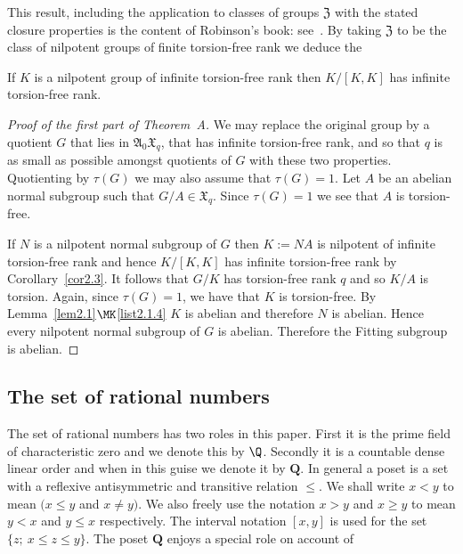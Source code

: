 This result, including the application to classes of groups $\mathfrak Z$ with the stated closure properties is the content of Robinson's book: see~\cite[5.2.5 and 5.2.6]{Rob96}. By taking $\mathfrak Z$ to be the class of nilpotent groups of finite torsion-free rank we deduce the

\begin{coro}\label{cor2.3}
If $K$ is a nilpotent group of infinite torsion-free rank then $K/[K,K]$ has infinite torsion-free rank.
\end{coro}


\begin{proof}[Proof of the first part of Theorem~A]
We may replace the original group by a quotient $G$ that lies in $\mathfrak A_0\mathfrak X_q$, that has infinite torsion-free rank, and so that $q$ is as small as possible amongst quotients of $G$ with these two properties. Quotienting by $\tau(G)$ we may also assume that $\tau(G)=1$. Let $A$ be an abelian normal subgroup such that $G/A\in\mathfrak X_q$. Since $\tau(G)=1$ we see that $A$ is torsion-free.

If $N$ is a nilpotent normal subgroup of $G$ then $K:=NA$ is nilpotent of infinite torsion-free rank and hence $K/[K,K]$ has infinite torsion-free rank by Corollary~\ref{cor2.3}. It follows that $G/K$ has torsion-free rank $q$ and so $K/A$ is torsion. Again, since $\tau(G)=1$, we have that $K$ is torsion-free. By Lemma~\ref{lem2.1}$\MK$\eqref{list2.1.4} $K$ is abelian and therefore $N$ is abelian. Hence every nilpotent normal subgroup of $G$ is abelian. Therefore the Fitting subgroup is abelian.
\end{proof}



\subsection{The set of rational numbers}
The set of rational numbers has two roles in this paper. First it is the prime field of characteristic zero and we denote this by $\Q$. Secondly it is a countable dense linear order and when in this guise we denote it by $\mathbf Q$. In general a poset is a set with a reflexive antisymmetric and transitive relation $\le$. We shall write $x<y$ to mean $(x\le y$ and $x\ne y)$. We also freely use the notation $x>y$ and $x\ge y$ to mean $y<x$ and $y\le x$ respectively. The interval notation $[x,y]$ is used for the set $\{z;\ x\le z\le y\}$. The poset $\mathbf Q$ enjoys a special role on account of

